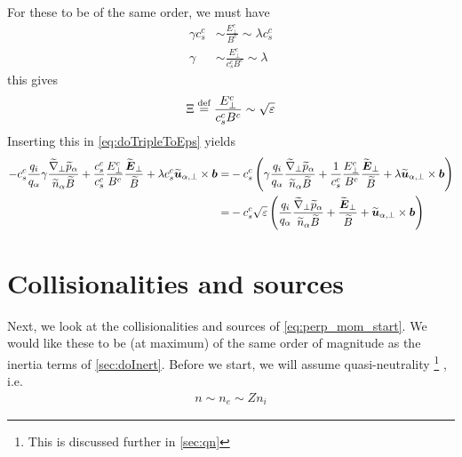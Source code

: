 %
For these to be of the same order, we must have
%
\begin{align*}
    \gamma c^c_s &\sim \frac{E_\perp^c}{B^c} \sim \lambda c^c_s \\
    \gamma     &\sim \frac{E_\perp^c}{c^c_sB^c} \sim \lambda
\end{align*}
%
this gives
%
\begin{align*}
    \Xi \overset{\text{def}}{=} \frac{E_\perp^c}{c^c_sB^c} \sim \sqrt{\varepsilon}
\end{align*}
%
Inserting this in \cref{eq:doTripleToEps} yields
%
\begin{align*}
-
c^c_s
\frac{q_i}{q_\a}
\gamma
\frac{ \wt{\grad}_\perp \wt{p}_\a }{\wt{n}_\a \wt{B}}
+ \frac{c^c_s}{c^c_s}\frac{E_\perp^c}{B^c}
\frac{\wt{\ve{E}}_\perp}{\wt{B}}
+\lambda c^c_s
\wt{\ve{u}}_{\a,\perp}\times\ve{b}
=&
-
c^c_s
\L(
\gamma
\frac{q_i}{q_\a}
\frac{ \wt{\grad}_\perp \wt{p}_\a }{\wt{n}_\a \wt{B}}
+ \frac{1}{c^c_s}\frac{E_\perp^c}{B^c}
\frac{\wt{\ve{E}}_\perp}{\wt{B}}
+\lambda
\wt{\ve{u}}_{\a,\perp}\times\ve{b}
\R)
\\
%
%
=&
-
c^c_s
\sqrt{\e}
\L(
\frac{q_i}{q_\a}
\frac{ \wt{\grad}_\perp \wt{p}_\a }{\wt{n}_\a \wt{B}}
+
\frac{\wt{\ve{E}}_\perp}{\wt{B}}
+
\wt{\ve{u}}_{\a,\perp}\times\ve{b}
\R)
\end{align*}

\section{Collisionalities and sources}
%
Next, we look at the collisionalities and sources of \cref{eq:perp_mom_start}.
We would like these to be (at maximum) of the same order of magnitude as the inertia terms of \cref{sec:doInert}.
Before we start, we will assume quasi-neutrality%
\footnote{This is discussed further in \cref{sec:qn}}%
%
, i.e.
%
\begin{align*}
    n\sim n_e \sim Zn_i
\end{align*}
%

